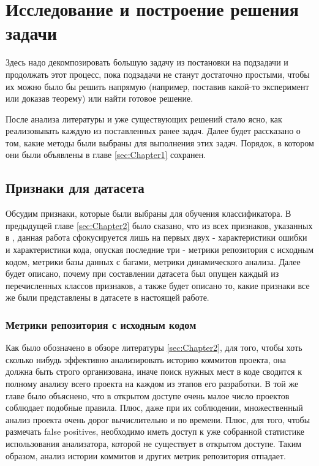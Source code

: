 \chapter{Исследование и построение решения задачи}
\label{sec:Chapter3} 

Здесь надо декомпозировать большую задачу из постановки на подзадачи и продолжать этот процесс, пока подзадачи не станут достаточно простыми, чтобы их можно было бы решить напрямую (например, поставив какой-то эксперимент или доказав теорему) или найти готовое решение.

После анализа литературы и уже существующих решений стало ясно, как реализовывать каждую из поставленных ранее задач. Далее будет рассказано о том, какие методы были выбраны для выполнения этих задач. Порядок, в котором они были объявлены в главе \ref{sec:Chapter1} сохранен.

\section{Признаки для датасета}

Обсудим признаки, которые были выбраны для обучения классификатора. В предыдущей главе \ref{sec:Chapter2} было сказано, что из всех признаков, указанных в \cite{HECKMAN2011363}, данная работа сфокусируется лишь на первых двух - характеристики ошибки и характеристики кода, опуская последние три - метрики репозитория с исходным кодом, метрики базы данных с багами, метрики динамического анализа. Далее будет описано, почему при составлении датасета был опущен каждый из перечисленных классов признаков, а также будет описано то, какие признаки все же были представлены в датасете в настоящей работе.

\subsection{Метрики репозитория с исходным кодом}
Как было обозначено в обзоре литературы \ref{sec:Chapter2}, для того, чтобы хоть сколько нибудь эффективно анализировать историю коммитов проекта, она должна быть строго организована, иначе поиск нужных мест в коде сводится к полному анализу всего проекта на каждом из этапов его разработки. В той же главе было объяснено, что в открытом доступе очень малое число проектов соблюдает подобные правила. Плюс, даже при их соблюдении, множественный анализ проекта очень дорог вычислительно и по времени. Плюс, для того, чтобы размечать false positives, необходимо иметь доступ к уже собранной статистике использования анализатора, которой не существует в открытом доступе. Таким образом, анализ истории коммитов и других метрик репозитория отпадает.

